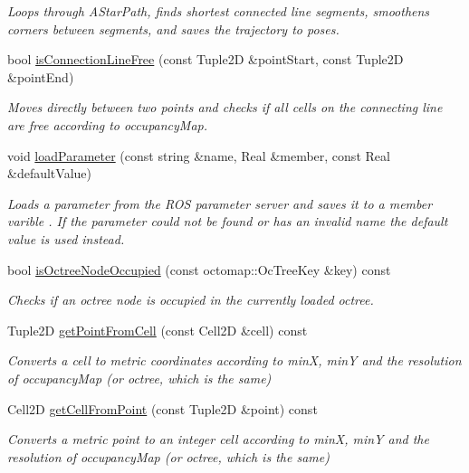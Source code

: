 \begin{DoxyCompactItemize}
\begin{DoxyCompactList}\small\item\em Loops through A\-Star\-Path, finds shortest connected line segments, smoothens corners between segments, and saves the trajectory to poses. \end{DoxyCompactList}\item 
bool \hyperlink{classSquirrelMotionPlanner_1_1Planner_a06bc0ce6344e84f31dca4c06d9986732}{is\-Connection\-Line\-Free} (const Tuple2\-D \&point\-Start, const Tuple2\-D \&point\-End)
\begin{DoxyCompactList}\small\item\em Moves directly between two points and checks if all cells on the connecting line are free according to occupancy\-Map. \end{DoxyCompactList}\item 
void \hyperlink{classSquirrelMotionPlanner_1_1Planner_a963470ef70623c6115b8cb004e500263}{load\-Parameter} (const string \&name, Real \&member, const Real \&default\-Value)
\begin{DoxyCompactList}\small\item\em Loads a parameter from the R\-O\-S parameter server and saves it to a member varible . If the parameter could not be found or has an invalid name the default value is used instead. \end{DoxyCompactList}\item 
bool \hyperlink{classSquirrelMotionPlanner_1_1Planner_a39d2cf7e35e9b17f64ec8ff8d5376d61}{is\-Octree\-Node\-Occupied} (const octomap\-::\-Oc\-Tree\-Key \&key) const 
\begin{DoxyCompactList}\small\item\em Checks if an octree node is occupied in the currently loaded octree. \end{DoxyCompactList}\item 
Tuple2\-D \hyperlink{classSquirrelMotionPlanner_1_1Planner_ae890ed4157ce8a06f27d39e4af57c18e}{get\-Point\-From\-Cell} (const Cell2\-D \&cell) const 
\begin{DoxyCompactList}\small\item\em Converts a cell to metric coordinates according to min\-X, min\-Y and the resolution of occupancy\-Map (or octree, which is the same) \end{DoxyCompactList}\item 
Cell2\-D \hyperlink{classSquirrelMotionPlanner_1_1Planner_a93073378ce0a34770bc52a032758d065}{get\-Cell\-From\-Point} (const Tuple2\-D \&point) const 
\begin{DoxyCompactList}\small\item\em Converts a metric point to an integer cell according to min\-X, min\-Y and the resolution of occupancy\-Map (or octree, which is the same) \end{DoxyCompactList}\item 

\end{DoxyCompactItemize}
